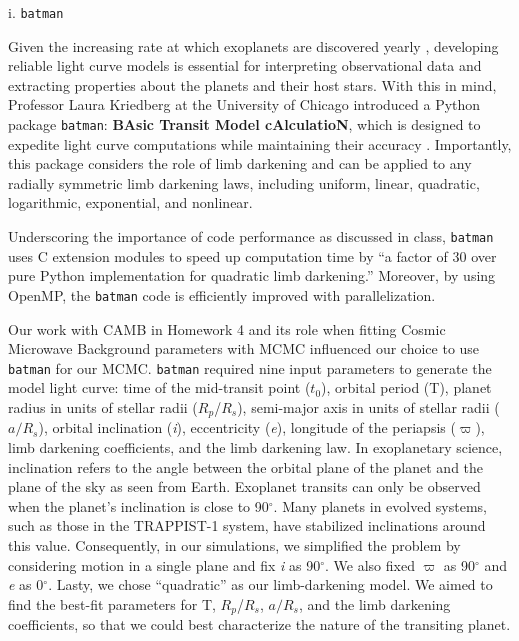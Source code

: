 \documentclass[linenumbers]{aastex631}
\begin{document}
i. {\tt\string batman}
\par \vspace{.1cm}
Given the increasing rate at which exoplanets are discovered yearly \citep{ourworldindata2024}, developing reliable light curve models is essential for interpreting observational data and extracting properties about the planets and their host stars. With this in mind, Professor Laura Kriedberg at the University of Chicago introduced a Python package {\tt\string batman}: \textbf{BAsic Transit Model cAlculatioN}, which is designed to expedite light curve computations while maintaining their accuracy \citep{batman}. Importantly, this package considers the role of limb darkening and can be applied to any radially symmetric limb darkening laws, including uniform, linear, quadratic, logarithmic, exponential, and nonlinear.
\par \vspace{.1 cm}
Underscoring the importance of code performance as discussed in class, {\tt\string batman} uses C extension modules to speed up computation time by “a factor of 30 over pure Python implementation for quadratic limb darkening.” Moreover, by using OpenMP, the {\tt\string batman} code is efficiently improved with parallelization.
\par \vspace{.1 cm}
Our work with CAMB in Homework 4 and its role when fitting Cosmic Microwave Background parameters with MCMC influenced our choice to use {\tt\string batman} for our MCMC. {\tt\string batman} required nine input parameters to generate the model light curve: time of the mid-transit point ($t_{0}$), orbital period (T), planet radius in units of stellar radii ($R_{p}$/$R_{s}$), semi-major axis in units of stellar radii ($a/R_{s}$), orbital inclination (\textit{i}), eccentricity (\textit{e}), longitude of the periapsis ($\varpi$), limb darkening coefficients, and the limb darkening law. In exoplanetary science, inclination refers to the angle between the orbital plane of the planet and the plane of the sky as seen from Earth. Exoplanet transits can only be observed when the planet’s inclination is close to 90$^{\circ}$. Many planets in evolved systems, such as those in the TRAPPIST-1 system, have stabilized inclinations around this value. Consequently, in our simulations, we simplified the problem by considering motion in a single plane and fix \textit{i} as 90$^{\circ}$. We also fixed $\varpi$ as 90$^{\circ}$ and \textit{e} as 0$^{\circ}$. Lasty, we chose “quadratic” as our limb-darkening model. We aimed to find the best-fit parameters for T, $R_{p}$/$R_{s}$, $a/R_{s}$, and the limb darkening coefficients, so that we could best characterize the nature of the transiting planet. 
\end{document}
